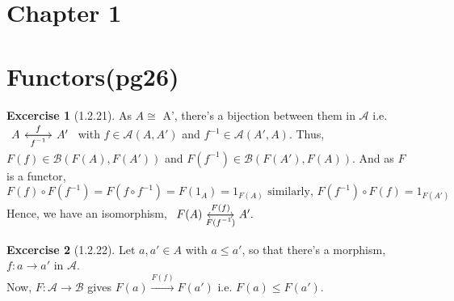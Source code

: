 \documentclass{article}
\theoremstyle{definition}
\newtheorem*{excercise}{Excercise}
\begin{document}
\section{Chapter 1}
\section{Functors(pg26)}

\begin{excercise}[1.2.21] %
	As $A \cong $ A', there's a bijection between them in $\mathcal{A} $ i.e.
	$\begin{tikzcd}
		A \arrow{r}{f} & \arrow{l}{f^{-1}}  A'
	\end{tikzcd}$
	with $f \in \mathcal{A}(A,A')$ and $ f^{-1} \in \mathcal{A}(A',A)$.
	Thus, $F(f) \in \mathcal{B}(F(A),F(A'))$ and $ F(f^{-1}) \in \mathcal{B}(F(A'),F(A))$.
	And as $F$ is a functor,
	\[ F(f) \circ F(f^{-1}) = F(f \circ f^{-1}) = F(1_A) = 1_{F(A)} \text{ similarly, }
	F(f^{-1}) \circ F(f) = 1_{F(A')} \]
	Hence, we have an isomorphism, $
	\begin{tikzcd}
		F(A) \arrow{r}{F(f)} & \arrow{l}{F(f^{-1})} A'.
	\end{tikzcd}$
\end{excercise}
\begin{excercise}[1.2.22] %
	Let $a,a' \in A $ with $a \leq a'$, so that there's a morphism, $f:a\rightarrow a'$ in $\mathcal{A}$.\\
	Now, $F:\mathcal{A} \rightarrow \mathcal{B} $ gives $F(a) \xrightarrow{F(f)} F(a')$ i.e. $F(a)\leq F(a')$.
\end{excercise}
\end{document}
